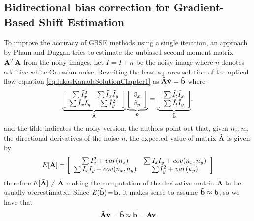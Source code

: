 \subsection{Bidirectional bias correction for Gradient-Based Shift Estimation}
\label{sec:ULS}
To improve the accuracy of GBSE methods using a single iteration, an approach by Pham and Duggan \cite{pham2008} tries to estimate the unbiased second moment matrix $\mathbf{A}^T \mathbf{A}$ from the noisy images. Let $\tilde{I} = I + n$ be the noisy image where $n$ denotes additive white Gaussian noise. Rewriting the least squares solution of the optical flow equation \eqref{eq:lukasKanadeSolutionChapter1} as $\tilde{\mathbf{A}}\tilde{\mathbf{v}} = \tilde{\mathbf{b}}$ where
\begin{equation}
\label{eq:biasedLS}
\underbrace{\left[\begin{array}{c c}
\sum \tilde{I}_x^2 & \sum \tilde{I}_x\tilde{I}_y \\
\sum \tilde{I}_xI_y & \sum \tilde{I}_y^2
\end{array}\right]}_{\tilde{\mathbf{A}}}
\underbrace{\left[\begin{array}{c}
\tilde{v}_x\\
\tilde{v}_y
\end{array}\right]}_{\tilde{\mathbf{v}}}
= 
\underbrace{\left[
\begin{array}{c c}
\sum \tilde{I}_t\tilde{I}_x \\ 
\sum \tilde{I}_t\tilde{I}_y
\end{array} \right]}_{\tilde{\mathbf{b}}},
\end{equation}
and the tilde indicates the noisy version, the authors point out that, given $n_x,n_y$ the directional derivatives of the noise $n$, the expected value of matrix $\tilde{\mathbf{A}}$ is given by
\begin{equation}
E[\tilde{\mathbf{A}}] = \left[\begin{array}{c c} \sum I_x^2 + var(n_x) & \sum I_xI_y + cov(n_x,n_y) \\ \sum I_xI_y + cov(n_x,n_y) & \sum I_y^2 + var(n_y) \end{array}\right]
\end{equation}
therefore $E[\tilde{\mathbf{A}}] \neq \mathbf{A}$ making the computation of the derivative matrix $\mathbf{A}$ to be usually overestimated. Since $E(\tilde{\mathbf{b}})\!=\!\mathbf{b}$, it makes sense to assume $\tilde{\mathbf{b}} \approx \mathbf{b}$, so we have that
\begin{equation}
\tilde{\mathbf{A}}\tilde{\mathbf{v}} = \tilde{\mathbf{b}} \approx \mathbf{b} = \mathbf{A}\mathbf{v}
 \end{equation}

